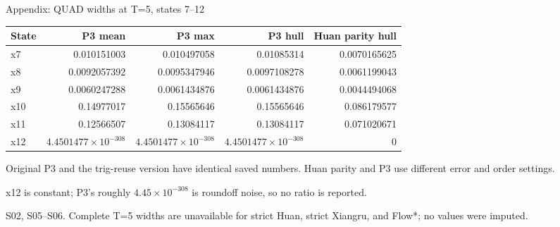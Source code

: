 \documentclass[aspectratio=169,11pt]{beamer}
\newcommand{\src}[1]{\par\vfill{\fontsize{7}{9}\selectfont\color{gray}#1\par}}
\begin{document}
\begin{frame}[t]{Appendix: QUAD widths at T=5, states 7–12}
\relax
\relax
{\footnotesize\setlength{\tabcolsep}{3.2pt}\renewcommand{\arraystretch}{1.18}
\noindent\begin{tabular*}{\linewidth}{@{\extracolsep{\fill}}lrrrr@{}}\toprule
\textbf{State} & \textbf{P3 mean} & \textbf{P3 max} & \textbf{P3 hull} & \textbf{Huan parity hull}\\ \midrule
x7 & 0.010151003 & 0.010497058 & 0.01085314 & 0.0070165625\\
x8 & 0.0092057392 & 0.0095347946 & 0.0097108278 & 0.0061199043\\
x9 & 0.0060247288 & 0.0061434876 & 0.0061434876 & 0.0044494068\\
x10 & 0.14977017 & 0.15565646 & 0.15565646 & 0.086179577\\
x11 & 0.12566507 & 0.13084117 & 0.13084117 & 0.071020671\\
x12 & \(4.4501477\times10^{-308}\) & \(4.4501477\times10^{-308}\) & \(4.4501477\times10^{-308}\) & 0\\
\bottomrule\end{tabular*}\par{}}\vspace{0.3cm}Original P3 and the trig-reuse version have identical saved numbers. Huan parity and P3 use different error and order settings.\par{}x12 is constant; P3's roughly \(4.45\times10^{-308}\) is roundoff noise, so no ratio is reported.
\src{S02, S05–S06. Complete T=5 widths are unavailable for strict Huan, strict Xiangru, and Flow*; no values were imputed.}
\end{frame}
\end{document}

